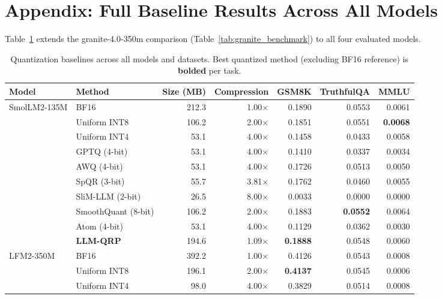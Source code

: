 \documentclass{article}
\begin{document}
\section*{Appendix: Full Baseline Results Across All Models}

Table~\ref{tab:combined_benchmark} extends the granite-4.0-350m comparison (Table~\ref{tab:granite_benchmark}) to all four evaluated models.

\begin{table}[htbp]
  \centering
  \footnotesize
  \renewcommand{\arraystretch}{0.82}
  \caption{Quantization baselines across all models and datasets. Best quantized method (excluding BF16 reference) is \textbf{bolded} per task.}
  \label{tab:combined_benchmark}
  \begin{tabular}{@{} l l rr rrr @{}}
    \toprule
    \textbf{Model} & \textbf{Method} & \textbf{Size (MB)} & \textbf{Compression} & \textbf{GSM8K} & \textbf{TruthfulQA} & \textbf{MMLU} \\
    \midrule
    \multirow{10}{*}{SmolLM2-135M}
     & BF16 & 212.3 & 1.00$\times$ & 0.1890 & 0.0553 & 0.0061 \\
     & Uniform INT8 & 106.2 & 2.00$\times$ & 0.1851 & 0.0551 & \textbf{0.0068} \\
     & Uniform INT4 & 53.1 & 4.00$\times$ & 0.1458 & 0.0433 & 0.0058 \\
     & GPTQ (4-bit) & 53.1 & 4.00$\times$ & 0.1410 & 0.0337 & 0.0034 \\
     & AWQ (4-bit) & 53.1 & 4.00$\times$ & 0.1726 & 0.0513 & 0.0050 \\
     & SpQR (3-bit) & 55.7 & 3.81$\times$ & 0.1762 & 0.0460 & 0.0055 \\
     & SliM-LLM (2-bit) & 26.5 & 8.00$\times$ & 0.0033 & 0.0000 & 0.0000 \\
     & SmoothQuant (8-bit) & 106.2 & 2.00$\times$ & 0.1883 & \textbf{0.0552} & 0.0064 \\
     & Atom (4-bit) & 53.1 & 4.00$\times$ & 0.1129 & 0.0362 & 0.0030 \\
     & \textbf{LLM-QRP} & 194.6 & 1.09$\times$ & \textbf{0.1888} & 0.0548 & 0.0060 \\
    \midrule
    \multirow{10}{*}{LFM2-350M}
     & BF16 & 392.2 & 1.00$\times$ & 0.4126 & 0.0543 & 0.0008 \\
     & Uniform INT8 & 196.1 & 2.00$\times$ & \textbf{0.4137} & 0.0545 & 0.0006 \\
     & Uniform INT4 & 98.0 & 4.00$\times$ & 0.3829 & 0.0514 & 0.0008 \\

\end{tabular}
\end{table}
\end{document}
